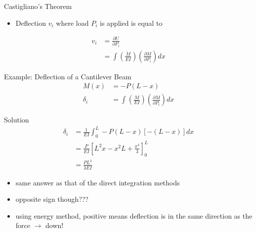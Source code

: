 \documentclass[10pt, svgnames]{beamer}
\begin{document}
\begin{frame}[label={sec:org5dde75c}]{Castigliano's Theorem}
\begin{itemize}
\item Deflection \(v_i\) where load \(P_i\) is applied is equal to
\end{itemize}

\begin{align*}
  v_i &= \frac{\partial U}{\partial P_i} \\
      &= \int \left( \frac{M}{EI} \right) \left( \frac{\partial M}{\partial P_{i}} \right) dx
\end{align*}
\end{frame}

\begin{frame}[label={sec:orgd25dea1}]{Example: Deflection of a Cantilever Beam}
\begin{align*}
  M(x) &=  - P(L - x) \\
  \delta_i &= \int \left( \frac{M}{EI} \right)\left( \frac{\partial M}{\partial P_i} \right)dx
\end{align*}
\end{frame}

\begin{frame}[label={sec:org35c8588}]{Solution}
\begin{align*}
  \delta_{i} &= \frac{1}{EI}\int_0^L - P(L - x)[ - (L - x)]dx  \\
             &= \frac{P}{EI}\left[ L^2x - x^2L + \frac{x^3}{3} \right]_0^L \\
             &= \frac{PL^3}{3EI}
\end{align*}

\begin{itemize}
\item same answer as that of the direct integration methods

\item opposite sign though???

\item using energy method, positive means deflection is in the same
direction as the force \(\rightarrow\) down!
\end{itemize}
\end{frame}
\end{document}
